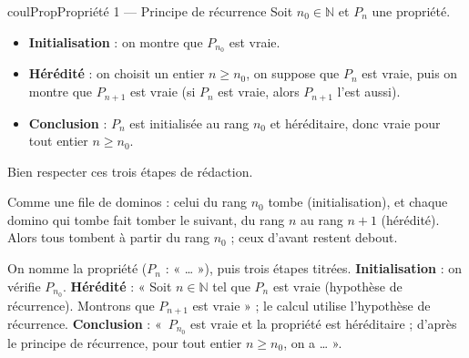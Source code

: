 \documentclass[11pt,a4paper]{article}
\makeatletter
\newcommand{\N}{\mathbb{N}}
\newcounter{lycee@signet}
\newcommand{\signet}[3][]{\stepcounter{lycee@signet}%
  \edef\lycee@dest{\if\relax\detokenize{#1}\relax
    signet.\arabic{lycee@signet}\else#1\fi}%
  \hypertarget{\lycee@dest}{}\bookmark[level=#2,dest=\lycee@dest]{#3}}
\newenvironment{proprietebox}[1][Propriété]%
  {\begin{boitecours}[phantom={\signet{2}{#1}}]{coulProp}{#1}}{\end{boitecours}}
\makeatother
\begin{document}
\begin{proprietebox}[Propriété 1 --- Principe de récurrence]
Soit $n_{0}\in\N$ et $P_{n}$ une propriété.
\begin{itemize}
  \item \textbf{Initialisation} : on montre que $P_{n_{0}}$ est vraie.
  \item \textbf{Hérédité} : on choisit un entier $n\geq n_{0}$, on suppose que $P_{n}$ est
        vraie, puis on montre que $P_{n+1}$ est vraie (si $P_{n}$ est vraie, alors
        $P_{n+1}$ l'est aussi).
  \item \textbf{Conclusion} : $P_{n}$ est initialisée au rang $n_{0}$ et héréditaire, donc
        vraie pour tout entier $n\geq n_{0}$.
\end{itemize}
Bien respecter ces trois étapes de rédaction.

\smallskip
\begin{minipage}[c]{0.5\linewidth}\raggedright
Comme une file de dominos : celui du rang $n_{0}$ tombe (initialisation), et chaque domino
qui tombe fait tomber le suivant, du rang $n$ au rang $n+1$ (hérédité). Alors tous
tombent à partir du rang $n_{0}$ ; ceux d'avant restent debout.
\end{minipage}\hfill
\begin{minipage}[c]{0.46\linewidth}\centering
{}
\end{minipage}
\end{proprietebox}

\begin{remarquebox}
On nomme la propriété ($P_{n}$ : « … »), puis trois étapes titrées.
\textbf{Initialisation} : on vérifie $P_{n_{0}}$. \textbf{Hérédité} : « Soit $n\in\N$ tel
que $P_{n}$ est vraie (hypothèse de récurrence). Montrons que $P_{n+1}$ est vraie » ; le
calcul utilise l'hypothèse de récurrence. \textbf{Conclusion} : «~$P_{n_{0}}$ est vraie et
la propriété est héréditaire ; d'après le principe de récurrence, pour tout entier
$n\geq n_{0}$, on a … ».
\end{remarquebox}
\end{document}
